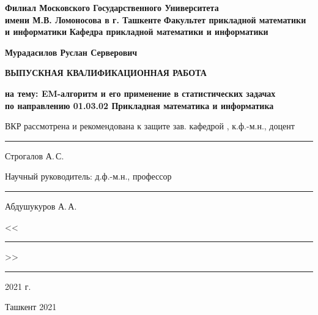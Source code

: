 \begin{titlepage}
\begin{center}
        
\textbf{Филиал Московского Государственного Университета\\
имени М.В. Ломоносова в г. Ташкенте} \vskip 0.3cm
\textbf{Факультет прикладной математики и информатики} \vskip 0.3cm
\textbf{Кафедра прикладной математики и информатики} \vskip 3cm
            
\textbf{Мурадасилов Руслан Серверович} \vskip 1cm
            
\textbf{ВЫПУСКНАЯ КВАЛИФИКАЦИОННАЯ РАБОТА} \vskip 1cm
            
\normalsize { \textbf{на тему: \guillemotleft EM-алгоритм и его применение в статистических задачах\guillemotright \\ \vskip 0.5cm
по направлению 01.03.02 \guillemotleft Прикладная математика и информатика\guillemotright} }
\vskip 1.5cm
\end{center}

\begin{flushleft}
ВКР рассмотрена и рекомендована к защите \vskip 5pt
зав. кафедрой \guillemotright, к.ф.-м.н., доцент\rule{3.2cm}{0.5pt} Строгалов А.\,С.
\end{flushleft}
\begin{flushleft}
Научный руководитель:\vskip 5pt
д.ф.-м.н., профессор \rule{6.9cm}{0.5pt} Абдушукуров А.\,А.
\end{flushleft}
          
\begin{flushright}
<<\rule{1cm}{0.5pt}>>\rule{3.5cm}{0.5pt} 2021 г.
\end{flushright}
        
\vfill   
\begin{center}
Ташкент 2021
\end{center}
\end{titlepage}